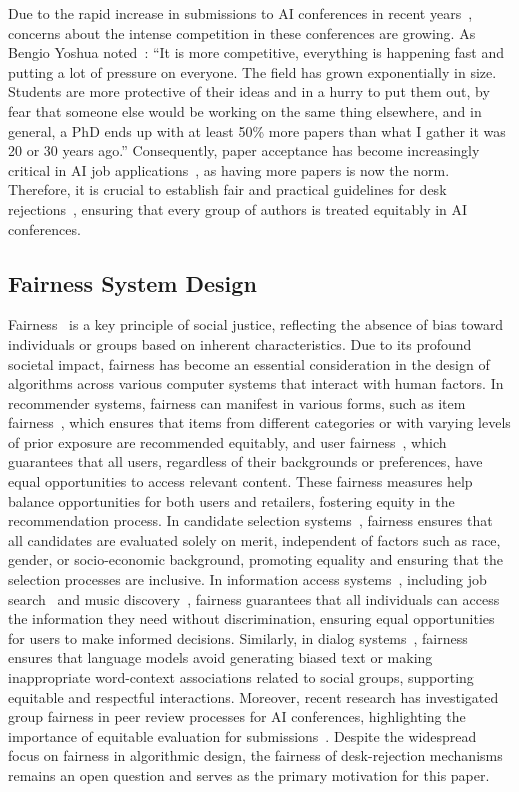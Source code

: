 Due to the rapid increase in submissions to AI conferences in recent years~\cite{stanford_ai_index}, concerns about the intense competition in these conferences are growing. As Bengio Yoshua noted~\cite{b20blog}: ``It is more competitive, everything is happening fast and putting a lot of pressure on everyone. The field has grown exponentially in size. Students are more protective of their ideas and in a hurry to put them out, by fear that someone else would be working on the same thing elsewhere, and in general, a PhD ends up with at least 50\% more papers than what I gather it was 20 or 30 years ago.'' Consequently, paper acceptance has become increasingly critical in AI job applications~\cite{a22, bbm+24}, as having more papers is now the norm. Therefore, it is crucial to establish fair and practical guidelines for desk rejections~\cite{takb18}, ensuring that every group of authors is treated equitably in AI conferences. 



\subsection{Fairness System Design}

Fairness~\cite{f12, mms+21} is a key principle of social justice, reflecting the absence of bias toward individuals or groups based on inherent characteristics. Due to its profound societal impact, fairness has become an essential consideration in the design of algorithms across various computer systems that interact with human factors. In recommender systems, fairness can manifest in various forms, such as item fairness~\cite{zfh+21, glg+21}, which ensures that items from different categories or with varying levels of prior exposure are recommended equitably, and user fairness~\cite{lcf+21, lcx+21}, which guarantees that all users, regardless of their backgrounds or preferences, have equal opportunities to access relevant content. These fairness measures help balance opportunities for both users and retailers, fostering equity in the recommendation process. In candidate selection systems~\cite{g93, whz20}, fairness ensures that all candidates are evaluated solely on merit, independent of factors such as race, gender, or socio-economic background, promoting equality and ensuring that the selection processes are inclusive. In information access systems~\cite{edb+22}, including job search~\cite{wmm+22} and music discovery~\cite{mrp+21}, fairness guarantees that all individuals can access the information they need without discrimination, ensuring equal opportunities for users to make informed decisions. Similarly, in dialog systems~\cite{gya22,grb+24}, fairness ensures that language models avoid generating biased text or making inappropriate word-context associations related to social groups, supporting equitable and respectful interactions. Moreover, recent research has investigated group fairness in peer review processes for AI conferences, highlighting the importance of equitable evaluation for submissions~\cite{ams23}.
Despite the widespread focus on fairness in algorithmic design, the fairness of desk-rejection mechanisms remains an open question and serves as the primary motivation for this paper.


